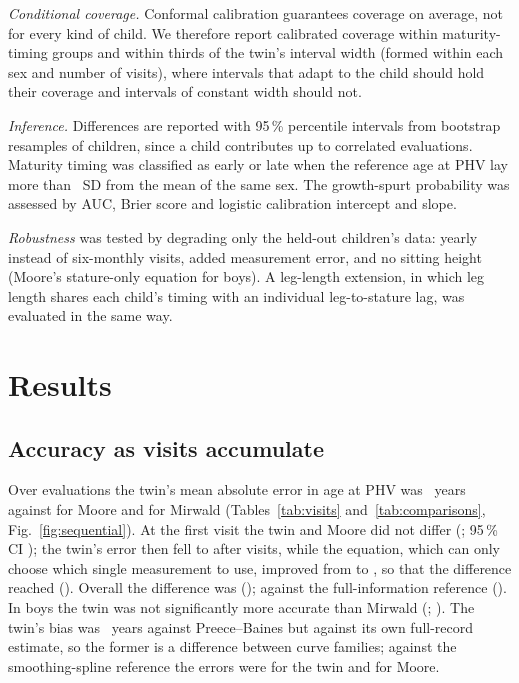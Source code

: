 \documentclass[journal]{IEEEtran}
\begin{document}
\emph{Conditional coverage.} Conformal calibration guarantees coverage on average, not for every
kind of child. We therefore report calibrated coverage within maturity-timing groups and within
thirds of the twin's interval width (formed within each sex and number of visits), where intervals
that adapt to the child should hold their coverage and intervals of constant width should not.

\emph{Inference.} Differences are reported with 95\,\% percentile intervals from \TwBootN{}
bootstrap resamples of children, since a child contributes up to \TwMaxVisits{} correlated
evaluations. Maturity timing was classified as early or late when the reference age at PHV lay more
than \SpecTimingSD{}~SD from the mean of the same sex. The growth-spurt probability was assessed by
AUC, Brier score and logistic calibration intercept and slope.

\emph{Robustness} was tested by degrading only the held-out children's data: yearly instead of
six-monthly visits, added measurement error, and no sitting height (Moore's stature-only equation
for boys). A leg-length extension, in which leg length shares each child's timing with an
individual leg-to-stature lag, was evaluated in the same way.

\section{Results}

\subsection{Accuracy as visits accumulate}
Over \TwEvaluations{} evaluations the twin's mean absolute error in age at PHV was \TwMAE{}~years
against \TwMooreMAE{} for Moore and \TwMirwaldMAE{} for Mirwald (Tables~\ref{tab:visits}
and~\ref{tab:comparisons}, Fig.~\ref{fig:sequential}). At the first visit the twin and Moore did not
differ (\TwDiffMooreFirst{}; 95\,\% CI \TwDiffMooreFirstCI{}); the twin's error then fell to
\TwMAELast{} after \TwMaxVisits{} visits, while the equation, which can only choose which single
measurement to use, improved from \TwMooreFirst{} to \TwMooreLast{}, so that the difference reached
\TwDiffMooreLast{} (\TwDiffMooreLastCI{}). Overall the difference was \TwDiffMoore{}
(\TwDiffMooreCI{}); against the full-information reference \TwDiffMooreFull{}
(\TwDiffMooreFullCI{}). In boys the twin was not significantly more accurate than Mirwald
(\TwDiffMirwald{}; \TwDiffMirwaldCI{}). The twin's bias was \TwBiasPB{}~years against
Preece--Baines but \TwBiasFull{} against its own full-record estimate, so the former is a difference
between curve families; against the smoothing-spline reference the errors were \SplineTwin{} for
the twin and \SplineMoore{} for Moore.
\end{document}
